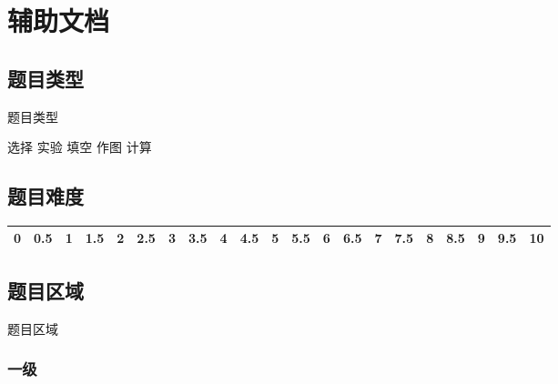 \documentclass{ctexbook}
\newcommand{\helpreflast}[1]{
\hypertarget{#1}{#1}
}
\begin{document}
	

\chapter{辅助文档}

\section{题目类型}
\helpreflast{题目类型}	
	
	
	选择 \quad 实验 \quad 填空 \quad 作图 \quad 计算

\section{题目难度}	

\begin{table}[h!]
 \centering 
 \begin{tabular}{|c|c|c|c|c|c|c|c|c|c|c|c|c|c|c|c|c|c|c|c|c|}
 \hline 
0 & 0.5 &1 & 1.5 & 2 &  2.5 & 3 & 3.5 & 4 & 4.5 & 5 & 5.5 & 6 & 6.5 & 7 & 7.5  & 8 & 8.5 & 9 & 9.5 & 10\\ 
 \hline 
 \end{tabular}
 \end{table} 


\section{题目区域}
\hypertarget{题目区域}{题目区域}
\subsection{一级}
	
\end{document}
